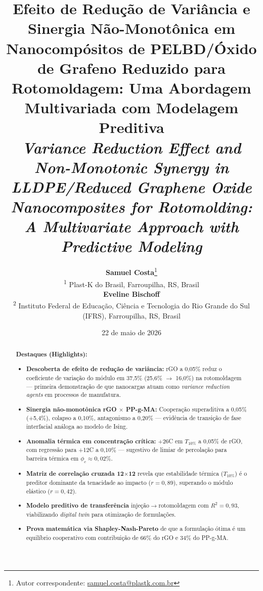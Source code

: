 \documentclass[12pt,a4paper,twoside]{article}
\title{\textbf{Efeito de Redução de Variância e Sinergia Não-Monotônica em Nanocompósitos de PELBD/Óxido de Grafeno Reduzido para Rotomoldagem: Uma Abordagem Multivariada com Modelagem Preditiva}\\[4pt]
\large \textit{Variance Reduction Effect and Non-Monotonic Synergy in LLDPE/Reduced Graphene Oxide Nanocomposites for Rotomolding: A Multivariate Approach with Predictive Modeling}}
\author{\textbf{Samuel Costa}\thanks{Autor correspondente: \href{mailto:samuel.costa@plastk.com.br}{samuel.costa@plastk.com.br}}\\[2pt]
\textsuperscript{1} Plast-K do Brasil, Farroupilha, RS, Brasil\\[4pt]
\textbf{Eveline Bischoff}\\[2pt]
\textsuperscript{2} Instituto Federal de Educação, Ciência e Tecnologia do Rio Grande do Sul (IFRS), Farroupilha, RS, Brasil}
\date{22 de maio de 2026}
\begin{document}
\maketitle

\begin{abstract}
\noindent\textbf{Destaques (Highlights):}
\begin{itemize}[leftmargin=*,nosep]
    \item \textbf{Descoberta de efeito de redução de variância:} rGO a 0,05\% reduz o coeficiente de variação do módulo em 37,5\% (25,6\% $\rightarrow$ 16,0\%) na rotomoldagem — primeira demonstração de que nanocargas atuam como \textit{variance reduction agents} em processos de manufatura.
    \item \textbf{Sinergia não-monotônica rGO $\times$ PP-g-MA:} Cooperação superaditiva a 0,05\% (+5,4\%), colapso a 0,10\%, antagonismo a 0,20\% — evidência de transição de fase interfacial análoga ao modelo de Ising.
    \item \textbf{Anomalia térmica em concentração crítica:} +26\textdegree C em $T_{10\%}$ a 0,05\% de rGO, com regressão para +12\textdegree C a 0,10\% — sugestivo de limiar de percolação para barreira térmica em $\phi_c \approx 0,02\%$.
    \item \textbf{Matriz de correlação cruzada 12$\times$12} revela que estabilidade térmica ($T_{10\%}$) é o preditor dominante da tenacidade ao impacto ($r = 0,89$), superando o módulo elástico ($r = 0,42$).
    \item \textbf{Modelo preditivo de transferência} injeção$\rightarrow$rotomoldagem com $R^2 = 0,93$, viabilizando \textit{digital twin} para otimização de formulações.
    \item \textbf{Prova matemática via Shapley-Nash-Pareto} de que a formulação ótima é um equilíbrio cooperativo com contribuição de 66\% do rGO e 34\% do PP-g-MA.
\end{itemize}
\end{abstract}
\end{document}

